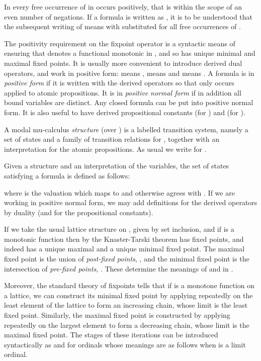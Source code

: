 \documentclass[copyright,creativecommons]{eptcs}
\def\w{\emph}
\begin{document}
In  
every free occurrence of  in  occurs positively, that is  within
the scope of an even number of negations. 
If a formula is written as , it is to be understood that the
subsequent writing of  means  with  substituted for all
free occurrences of . 

The positivity requirement on the fixpoint operator is a syntactic
means of ensuring that  denotes a functional monotonic in ,
and so has unique minimal and maximal fixed points. It is usually  
more convenient to
introduce derived dual operators, and work in
positive form:  means ,   means 
and  means . 
A formula is in \w{positive form} if it is
written with the derived operators so that  only occurs applied to
atomic propositions. It is in \w{positive normal form} if in addition
all bound variables are distinct. Any closed formula can be put into positive 
normal form. It is also useful to have derived propositional constants
 (for ) and  (for ). 

A modal mu-calculus \w{structure}  (over ) is a labelled
transition system, namely a set  of states and a family of transition
relations  for  ,  
together with an interpretation  for
the atomic propositions.  As usual we write  for 
. 

Given a structure  and an interpretation  
of the variables, the set  of states satisfying a formula
 is defined as follows:

where  is the valuation which maps  to  and otherwise
agrees with . If we are working in positive normal form, we may
add definitions for the derived operators by duality (and for the propositional
constants). 


If we take the usual lattice structure on , given by set inclusion, and 
if  is a monotonic function then by the Knaster-Tarski theorem  has fixed 
points, and indeed has a unique maximal and a unique minimal fixed point.
The maximal fixed point is the union of
\w{post-fixed points}, , and the minimal fixed point 
is the intersection of \w{pre-fixed points}, . These determine the meanings of  and  in .
 
Moreover, the standard theory of fixpoints tells 
that if  is a monotone function on a
lattice, we can construct its minimal fixed point  by applying
 repeatedly on the least element  of the lattice
to form an increasing
chain,  whose limit is the least fixed point.
Similarly,  the maximal fixed point is constructed
by applying  repeatedly on the largest element
to form a decreasing chain, whose limit is the maximal  fixed point.
The stages of these iterations  can be introduced syntactically as 
 and  for ordinals 
whose meanings are  as follows when   is a limit ordinal.
\end{document}
